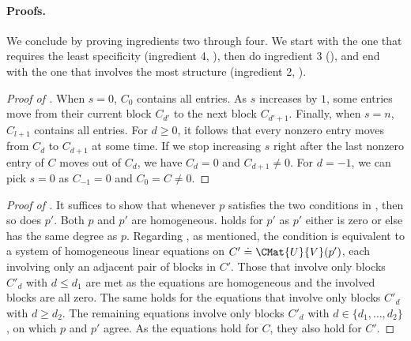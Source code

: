 \documentclass{toc}
\begin{document}
\paragraph{Proofs.}
We conclude by proving ingredients two through four.
We start with the one that requires the least specificity (ingredient 4, ), then do ingredient 3 (), and end with the one that involves the most structure (ingredient 2, ).

\begin{proof}[Proof of ]
  When $s=0$, $C_0$ contains all entries. 
  As $s$ increases by $1$,
  some entries move from their current block $C_{d'}$ to the next block
  $C_{d'+1}$.
  Finally, when $s=n$, $C_{l+1}$ contains all entries.
  For $d \ge 0$, it follows that every nonzero entry moves from $C_d$ to $C_{d+1}$ at some time. If we stop increasing $s$ right after the last nonzero entry of $C$ moves
  out of \(C_d\), we have $C_d=0$ and $C_{d+1} \ne 0$. For $d=-1$, we can pick $s=0$ as $C_{-1}=0$ and $C_0=C \ne 0$. 
\end{proof}

\begin{proof}[Proof of ]
  It suffices to show that whenever $p$ satisfies the two conditions in
  , then so does $p'$. Both $p$ and $p'$ are homogeneous. 
   holds for $p'$ as
  \(p'\) either is zero or else has the same degree as \(p\).
  Regarding , as
  mentioned, the condition is equivalent to a system of homogeneous
  linear equations on \(C' \doteq \CMat{U}{V}(p')\), each involving
  only an adjacent pair of blocks in $C'$.
  Those that involve only blocks $C'_d$ with $d \le d_1$ are met as the
  equations are homogeneous and the involved blocks are all zero.
  The same holds for the equations that involve only blocks $C'_d$
  with $d \ge d_2$.
  The remaining equations involve only blocks $C'_d$ with
  $d \in \{d_1, \dots, d_2\}$,
  on which $p$ and $p'$ agree.
  As the equations hold for \(C\), they also hold for $C'$.
\end{proof}
\end{document}
